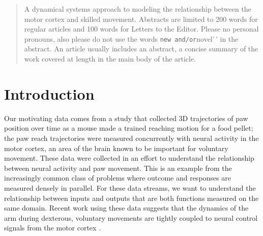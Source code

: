 \documentclass[preprint]{JASA}
\begin{document}
\begin{abstract}
A dynamical systems approach to modeling the relationship between the
motor cortex and skilled movement. Abstracts are limited to 200 words
for regular articles and 100 words for Letters to the Editor. Please no
personal pronouns, also please do not use the words
\texttt{new\textquotesingle{}\textquotesingle{}\ and/or}novel'\,' in the
abstract. An article usually includes an abstract, a concise summary of
the work covered at length in the main body of the article.
\end{abstract}


\maketitle




\hypertarget{introduction}{%
\section{Introduction}\label{introduction}}

\label{sec:intro}

Our motivating data comes from a study that collected 3D trajectories of
paw position over time as a mouse made a trained reaching motion for a
food pellet; the paw reach trajectories were measured concurrently with
neural activity in the motor cortex, an area of the brain known to be
important for voluntary movement. These data were collected in an effort
to understand the relationship between neural activity and paw movement.
This is an example from the increasingly common class of problems where
outcome and responses are measured densely in parallel. For these data
streams, we want to understand the relationship between inputs and
outputs that are both functions measured on the same domain. Recent work
using these data suggests that the dynamics of the arm during dexterous,
voluntary movements are tightly coupled to neural control signals from
the motor cortex \citep{guo2015, sauerbrei2018}.
\end{document}
